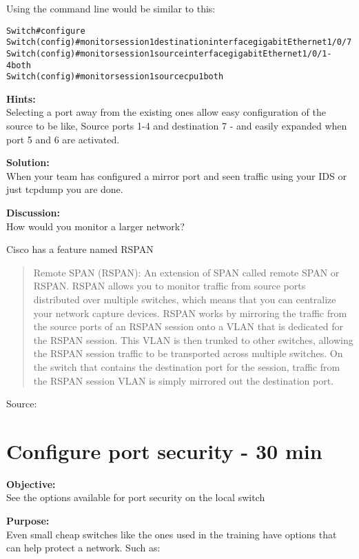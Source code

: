 \documentclass[a4paper,11pt,notitlepage]{report}
\begin{document}
Using the command line would be similar to this:
\begin{alltt}
Switch#configure
Switch(config)#monitor session 1 destination interface gigabitEthernet 1/0/7
Switch(config)#monitor session 1 source interface gigabitEthernet 1/0/1-4 both
Switch(config)#monitor session 1 source cpu 1 both
\end{alltt}


{\bf Hints:}\\
Selecting a port away from the existing ones allow easy configuration of the source to be like, Source ports 1-4 and destination 7 - and easily expanded when port 5 and 6 are activated.

{\bf Solution:}\\
When your team has configured a mirror port and seen traffic using your IDS or just tcpdump you are done.

{\bf Discussion:}\\
How would you monitor a larger network?

Cisco has a feature named RSPAN

\begin{quote}
Remote SPAN (RSPAN): An extension of SPAN called remote SPAN or RSPAN. RSPAN allows you to monitor traffic from source ports distributed over multiple switches, which means that you can centralize your network capture devices. RSPAN works by mirroring the traffic from the source ports of an RSPAN session onto a VLAN that is dedicated for the RSPAN session. This VLAN is then trunked to other switches, allowing the RSPAN session traffic to be transported across multiple switches. On the switch that contains the destination port for the session, traffic from the RSPAN session VLAN is simply mirrored out the destination port.
\end{quote}
Source: {\small{}}



\chapter{Configure port security - 30 min}
\label{ex:port-security}

{\bf Objective:}\\
See the options available for port security on the local switch

{\bf Purpose:}\\
Even small cheap switches like the ones used in the training have options that can help protect a network. Such as:
\end{document}
